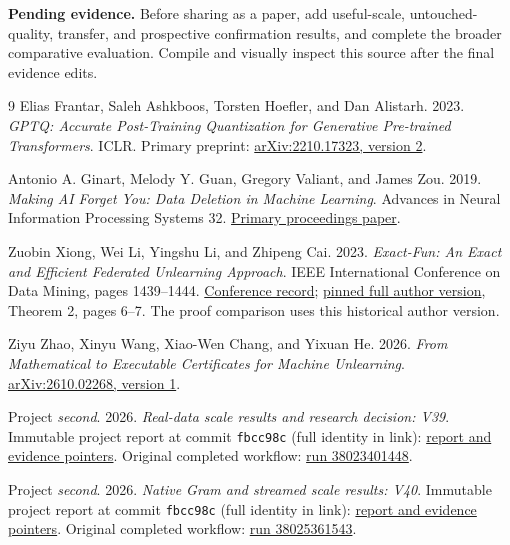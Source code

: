 \documentclass[10pt,twocolumn,letterpaper]{article}
\newcommand{\pending}[1]{\par\noindent\textbf{Pending evidence.} #1\par}
\begin{document}
\pending{Before sharing as a paper, add useful-scale, untouched-quality,
transfer, and prospective confirmation results, and complete the broader
comparative evaluation. Compile and visually inspect this source after the final
evidence edits.}

\begin{thebibliography}{9}
Elias Frantar, Saleh Ashkboos, Torsten Hoefler, and Dan Alistarh.
2023. \emph{GPTQ: Accurate Post-Training Quantization for Generative Pre-trained
Transformers}. ICLR. Primary preprint:
\href{https://arxiv.org/abs/2210.17323v2}{arXiv:2210.17323, version 2}.

Antonio A. Ginart, Melody Y. Guan, Gregory Valiant, and James Zou.
2019. \emph{Making AI Forget You: Data Deletion in Machine Learning}.
Advances in Neural Information Processing Systems 32.
\href{https://papers.nips.cc/paper_files/paper/2019/file/cb79f8fa58b91d3af6c9c991f63962d3-Paper.pdf}{Primary proceedings paper}.

Zuobin Xiong, Wei Li, Yingshu Li, and Zhipeng Cai.
2023. \emph{Exact-Fun: An Exact and Efficient Federated Unlearning Approach}.
IEEE International Conference on Data Mining, pages 1439--1444.
\href{https://doi.org/10.1109/ICDM58522.2023.00188}{Conference record};
\href{https://github.com/zuobinxiong/zuobinxiong.github.io/blob/300a0672be8d265ddebf20d6e69f790456a1bd81/assets/pdf/ExactFedUnlearning.pdf}{pinned full author version},
Theorem 2, pages 6--7. The proof comparison uses this historical author version.

Ziyu Zhao, Xinyu Wang, Xiao-Wen Chang, and Yixuan He.
2026. \emph{From Mathematical to Executable Certificates for Machine Unlearning}.
\href{https://arxiv.org/html/2610.02268v1}{arXiv:2610.02268, version 1}.

Project \emph{second}. 2026. \emph{Real-data scale results and research decision:
V39}. Immutable project report at commit
\texttt{fbcc98c} (full identity in link):
\href{https://github.com/priyankjairaj100/second/blob/fbcc98c6559de4b88ffc9c8b960cf680d89e29d3/docs/SCALE_RESULTS_V39.md}{report and evidence pointers}.
Original completed workflow:
\href{https://github.com/priyankjairaj100/second/actions/runs/38023401448}{run 38023401448}.

Project \emph{second}. 2026. \emph{Native Gram and streamed scale results: V40}.
Immutable project report at commit
\texttt{fbcc98c} (full identity in link):
\href{https://github.com/priyankjairaj100/second/blob/fbcc98c6559de4b88ffc9c8b960cf680d89e29d3/docs/NATIVE_SCALE_RESULTS_V40.md}{report and evidence pointers}.
Original completed workflow:
\href{https://github.com/priyankjairaj100/second/actions/runs/38025361543}{run 38025361543}.


\end{thebibliography}
\end{document}
